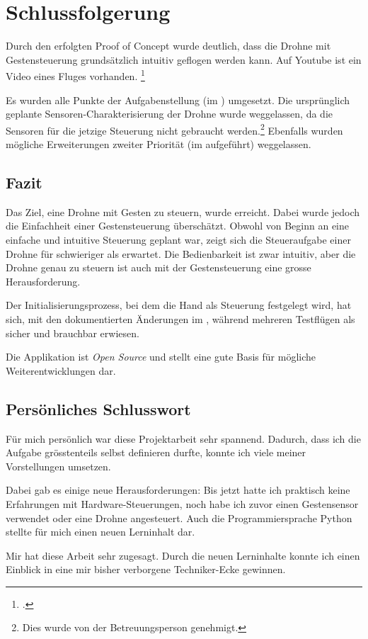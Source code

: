 \chapter{Schlussfolgerung}
Durch den erfolgten Proof of Concept wurde deutlich, dass die Drohne mit Gestensteuerung grundsätzlich intuitiv geflogen werden kann.
Auf Youtube ist ein Video eines Fluges vorhanden.
\footcite{Crazyflie_20_with_Leap_Motion_Gesture_controlled_YouTube_2015-09-04}

Es wurden alle Punkte der Aufgabenstellung (im ) umgesetzt.
Die ursprünglich geplante Sensoren-Charakterisierung der Drohne wurde weggelassen, da die Sensoren für die jetzige Steuerung nicht gebraucht werden.\footnote{Dies wurde von der Betreuungsperson genehmigt.}
Ebenfalls wurden mögliche Erweiterungen zweiter Priorität (im  aufgeführt) weggelassen.

\section{Fazit}
Das Ziel, eine Drohne mit Gesten zu steuern, wurde erreicht.
Dabei wurde jedoch die Einfachheit einer Gestensteuerung überschätzt.
Obwohl von Beginn an eine einfache und intuitive Steuerung geplant war, zeigt sich die Steueraufgabe einer Drohne für schwieriger als erwartet.
Die Bedienbarkeit ist zwar intuitiv, aber die Drohne genau zu steuern ist auch mit der Gestensteuerung eine grosse Herausforderung.

Der Initialisierungsprozess, bei dem die Hand als Steuerung festgelegt wird, hat sich, mit den dokumentierten Änderungen im , während mehreren Testflügen als sicher und brauchbar erwiesen.

Die Applikation ist \textit{Open Source} und stellt eine gute Basis für mögliche Weiterentwicklungen dar.


\section{Persönliches Schlusswort}
Für mich persönlich war diese Projektarbeit sehr spannend.
Dadurch, dass ich die Aufgabe grösstenteils selbst definieren durfte, konnte ich viele meiner Vorstellungen umsetzen.

Dabei gab es einige neue Herausforderungen:
Bis jetzt hatte ich praktisch keine Erfahrungen mit Hardware-Steuerungen, noch habe ich zuvor einen Gestensensor verwendet oder eine Drohne angesteuert.
Auch die Programmiersprache Python stellte für mich einen neuen Lerninhalt dar.

Mir hat diese Arbeit sehr zugesagt.
Durch die neuen Lerninhalte konnte ich einen Einblick in eine mir bisher verborgene Techniker-Ecke gewinnen.
